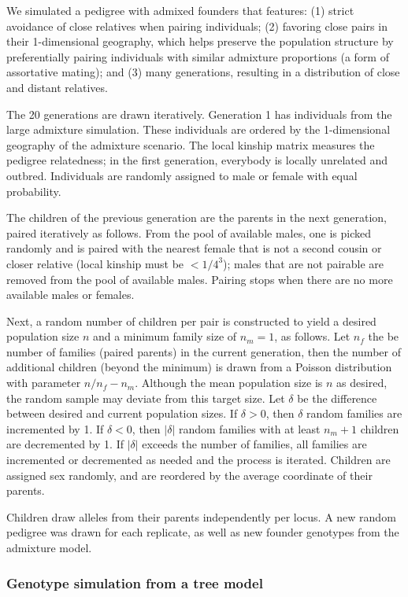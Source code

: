\documentclass[11pt]{article}
\begin{document}
We simulated a pedigree with admixed founders that features:
(1) strict avoidance of close relatives when pairing individuals;
(2) favoring close pairs in their 1-dimensional geography, which helps preserve the population structure by preferentially pairing individuals with similar admixture proportions (a form of assortative mating); and
(3) many generations, resulting in a distribution of close and distant relatives.

The 20 generations are drawn iteratively.
Generation 1 has individuals from the large admixture simulation.
These individuals are ordered by the 1-dimensional geography of the admixture scenario.
The local kinship matrix measures the pedigree relatedness; in the first generation, everybody is locally unrelated and outbred.
Individuals are randomly assigned to male or female with equal probability.

The children of the previous generation are the parents in the next generation, paired iteratively as follows.
From the pool of available males, one is picked randomly and is paired with the nearest female that is not a second cousin or closer relative (local kinship must be $< 1/4^3$); males that are not pairable are removed from the pool of available males.
Pairing stops when there are no more available males or females.

Next, a random number of children per pair is constructed to yield a desired population size $n$ and a minimum family size of $n_m=1$, as follows.
Let $n_f$ the be number of families (paired parents) in the current generation, then the number of additional children (beyond the minimum) is drawn from a Poisson distribution with parameter $n/n_f - n_m$.
Although the mean population size is $n$ as desired, the random sample may deviate from this target size.
Let $\delta$ be the difference between desired and current population sizes.
If $\delta > 0$, then $\delta$ random families are incremented by 1.
If $\delta < 0$, then $|\delta|$ random families with at least $n_m+1$ children are decremented by 1.
If $|\delta|$ exceeds the number of families, all families are incremented or decremented as needed and the process is iterated.
Children are assigned sex randomly, and are reordered by the average coordinate of their parents.

Children draw alleles from their parents independently per locus.
A new random pedigree was drawn for each replicate, as well as new founder genotypes from the admixture model.

\subsubsection{Genotype simulation from a tree model}
\end{document}
